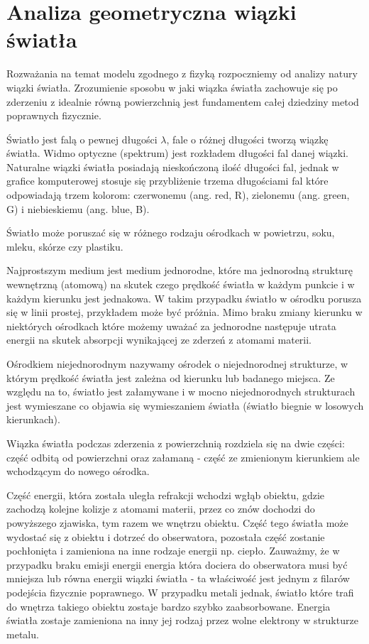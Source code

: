 \documentclass[../main.tex]{subfiles}
\begin{document}
\section{Analiza geometryczna wiązki światła}

Rozważania na temat modelu zgodnego z fizyką rozpoczniemy od analizy natury
wiązki światła. Zrozumienie sposobu w jaki wiązka światła zachowuje się po
zderzeniu z idealnie równą powierzchnią jest fundamentem całej dziedziny metod
poprawnych fizycznie.

Światło jest falą o pewnej długości $\lambda$, fale o różnej długości tworzą
wiązkę światła. Widmo optyczne (spektrum) jest rozkładem długości fal danej
wiązki. Naturalne wiązki światła posiadają nieskończoną ilość długości fal,
jednak w grafice komputerowej stosuje się przybliżenie trzema długościami fal
które odpowiadają trzem kolorom: czerwonemu (ang. red, R), zielonemu (ang.
green, G) i niebieskiemu (ang. blue, B).

Światło może poruszać się w różnego rodzaju ośrodkach w powietrzu, soku, mleku,
skórze czy plastiku.

Najprostszym medium jest medium jednorodne, które ma jednorodną strukturę
wewnętrzną (atomową) na skutek czego prędkość światła w każdym punkcie i w
każdym kierunku jest jednakowa. W takim przypadku światło w ośrodku porusza się
w linii prostej, przykładem może być próżnia. Mimo braku zmiany kierunku w
niektórych ośrodkach które możemy uważać za jednorodne następuje utrata energii
na skutek absorpcji wynikającej ze zderzeń z atomami materii.

Ośrodkiem niejednorodnym nazywamy ośrodek o niejednorodnej strukturze, w którym
prędkość światła jest zależna od kierunku lub badanego miejsca. Ze względu na
to, światło jest załamywane i w mocno niejednorodnych strukturach jest
wymieszane co objawia się wymieszaniem światła (światło biegnie w losowych
kierunkach).

Wiązka światła podczas zderzenia z powierzchnią rozdziela się na dwie części:
część odbitą od powierzchni oraz załamaną - część ze zmienionym kierunkiem ale
wchodzącym do nowego ośrodka.

Część energii, która została uległa refrakcji wchodzi wgłąb obiektu, gdzie
zachodzą kolejne kolizje z atomami materii, przez co znów dochodzi do
powyższego zjawiska, tym razem we wnętrzu obiektu. Część tego światła może
wydostać się z obiektu i dotrzeć do obserwatora, pozostała część zostanie
pochłonięta i zamieniona na inne rodzaje energii np. ciepło. Zauważmy, że w
przypadku braku emisji energii energia która dociera do obserwatora musi być
mniejsza lub równa energii wiązki światła - ta właściwość jest jednym z filarów
podejścia fizycznie poprawnego. W przypadku metali jednak, światło które trafi
do wnętrza takiego obiektu zostaje bardzo szybko zaabsorbowane. Energia światła
zostaje zamieniona na inny jej rodzaj przez wolne elektrony w strukturze
metalu.
\end{document}
